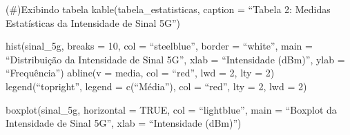 \documentclass[
  letterpaper,
  DIV=11,
  numbers=noendperiod]{scrartcl}
\begin{document}
(\#)Exibindo tabela kable(tabela\_estatisticas, caption = ``Tabela 2:
Medidas Estatísticas da Intensidade de Sinal 5G'')

hist(sinal\_5g, breaks = 10, col = ``steelblue'', border = ``white'',
main = ``Distribuição da Intensidade de Sinal 5G'', xlab = ``Intensidade
(dBm)'', ylab = ``Frequência'') abline(v = media, col = ``red'', lwd =
2, lty = 2) legend(``topright'', legend = c(``Média''), col = ``red'',
lty = 2, lwd = 2)

boxplot(sinal\_5g, horizontal = TRUE, col = ``lightblue'', main =
``Boxplot da Intensidade de Sinal 5G'', xlab = ``Intensidade (dBm)'')

\subsection{}\label{section}
\end{document}
